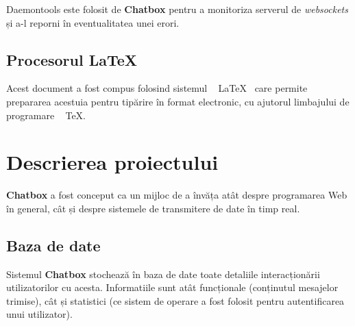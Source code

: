 \documentclass[12pt,a4paper]{article}
\begin{document}
Daemontools este folosit de \textbf{Chatbox} pentru a monitoriza serverul 
de \textit{websockets} și a-l reporni  în eventualitatea unei erori.

\subsection{Procesorul \LaTeX}
Acest document a fost compus folosind sistemul ~ \LaTeX ~ care permite prepararea
acestuia pentru tipărire în format electronic,
cu ajutorul limbajului de programare ~ \TeX.



\newpage
\section{Descrierea proiectului}
\textbf{Chatbox} a fost conceput ca un mijloc de a învăța atât despre programarea
Web în general, cât și despre sistemele de transmitere de date în timp real.

\subsection{Baza de date}
Sistemul \textbf{Chatbox} stochează  în baza de date toate detaliile interacționării
utilizatorilor cu acesta. Informatiile sunt atât funcționale 
(conținutul mesajelor trimise), cât și statistici (ce sistem de operare a fost folosit pentru
autentificarea unui utilizator).

\end{document}
